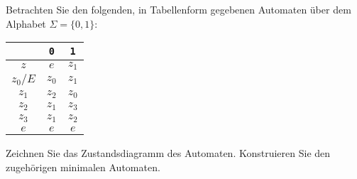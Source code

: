 Betrachten Sie den folgenden, in Tabellenform gegebenen
Automaten über dem Alphabet $\Sigma=\{0,1\}$:
\begin{center}
\begin{tabular}{|c|cc|}
\hline
&{\tt 0}&{\tt 1}\\
\hline
$z$&$e$&$z_1$\\
$z_0/E$&$z_0$&$z_1$\\
$z_1$&$z_2$&$z_0$\\
$z_2$&$z_1$&$z_3$\\
$z_3$&$z_1$&$z_2$\\
$e$&$e$&$e$\\
\hline
\end{tabular}
\end{center}
Zeichnen Sie das Zustandsdiagramm des Automaten. Konstruieren Sie den
zugehörigen minimalen Automaten.

